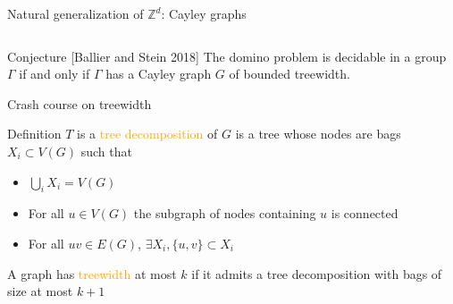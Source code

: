 \documentclass[11pt,dvipsnames,presentation,aspectratio=169]{beamer}
\newcommand{\myorange}{Orange}
\newcommand{\define}[1]{\textcolor{\myorange}{#1}}
\begin{document}
\begin{frame}{Natural generalization of $\mathbb{Z}^d$: Cayley graphs}
\begin{columns}
\begin{column}{.35\textwidth}
\begin{center}
      \end{center}
    \end{column}
  \end{columns}

  \begin{alertblock}{Conjecture [Ballier and Stein 2018]}
    The domino problem is decidable in a group $\Gamma$ if and only if $\Gamma$
    has a Cayley graph $G$ of bounded treewidth.
  \end{alertblock}

\end{frame}

\begin{frame}{Crash course on treewidth}
  \begin{exampleblock}{Definition}
    $T$ is a \define{tree decomposition} of $G$ is a tree whose nodes are bags $X_i
    \subset V(G)$ such that
    \begin{itemize}
    \item $\bigcup_{i} X_i = V(G)$
    \item For all $u \in V(G)$ the subgraph of nodes containing $u$ is connected
    \item For all $uv \in E(G)$, $\exists X_i, \{u,v\} \subset X_i$
    \end{itemize}

    A graph has \define{treewidth} at most $k$ if it admits a tree decomposition with
    bags of size at most $k+1$
  \end{exampleblock}

\end{frame}
\end{document}
